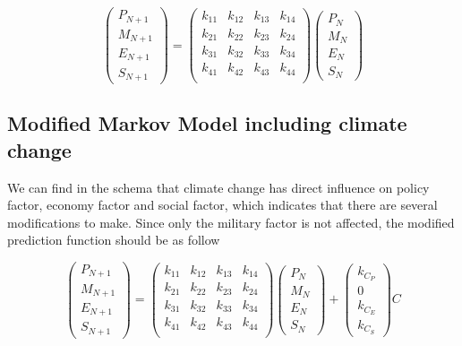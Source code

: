 \documentclass{mcmthesis}
\begin{document}
$$
\left(
\begin{matrix}
	P_{N+1} \\ M_{N+1} \\ E_{N+1} \\ S_{N+1}
\end{matrix}
\right) 
= 
\left(
\begin{matrix}
k_{11} & k_{12} & k_{13} & k_{14} \\
k_{21} & k_{22} & k_{23} & k_{24} \\
k_{31} & k_{32} & k_{33} & k_{34} \\
k_{41} & k_{42} & k_{43} & k_{44} \\
\end{matrix}
\right) 
\left(
\begin{matrix}
P_N \\ M_N \\ E_N \\ S_N
\end{matrix}
\right) 
$$

\subsection{Modified Markov Model including climate change}

We can find in the schema that climate change has direct influence on policy factor, economy factor and social factor, which indicates that there are several modifications to make. Since only the military factor is not affected, the modified prediction function should be as follow

$$
\left(
\begin{matrix}
	P_{N+1} \\ M_{N+1} \\ E_{N+1} \\ S_{N+1}
\end{matrix}
\right) 
= 
\left(
\begin{matrix}
k_{11} & k_{12} & k_{13} & k_{14} \\
k_{21} & k_{22} & k_{23} & k_{24} \\
k_{31} & k_{32} & k_{33} & k_{34} \\
k_{41} & k_{42} & k_{43} & k_{44} \\
\end{matrix}
\right) 
\left(
\begin{matrix}
P_N \\ M_N \\ E_N \\ S_N
\end{matrix}
\right) 
+
\left(
\begin{matrix}
k_C_P \\ {0} \\ k_C_E \\ k_C_S
\end{matrix}
\right) 
C
$$
\end{document}

